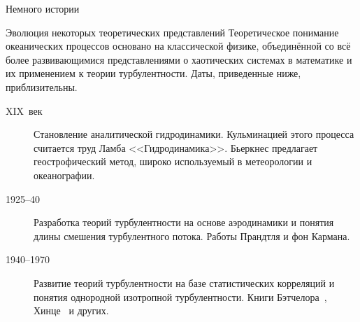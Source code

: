 \begin{chapter}{Немного истории}
\begin{section}{Эволюция некоторых теоретических представлений}
Теоретическое понимание океанических процессов основано на
классической физике, объединённой со всё более развивающимися
представлениями о хаотических системах в математике и их применением
к теории турбулентности. Даты, приведенные ниже, приблизительны.
%

\begin{description}
\item[XIX~век] Становление аналитической гидродинамики. Кульминацией
этого процесса считается труд Ламба <<Гидродинамика>>. Бьеркнес
предлагает геострофический метод, широко используемый в
метеорологии и океанографии.
%

\item[1925--40] Разработка теорий турбулентности на основе
аэродинамики и понятия длины смешения турбулентного потока. 
Работы Прандтля и фон Кармана.
%


\item[1940--1970] Развитие теорий турбулентности на базе
статистических корреляций и понятия однородной изотропной
турбулентности. Книги Бэтчелора~\cite{Batchelor:1967}, Хинце~\cite{Hinze:1975} и
других.
%


\end{description}
\end{section}
\end{chapter}
